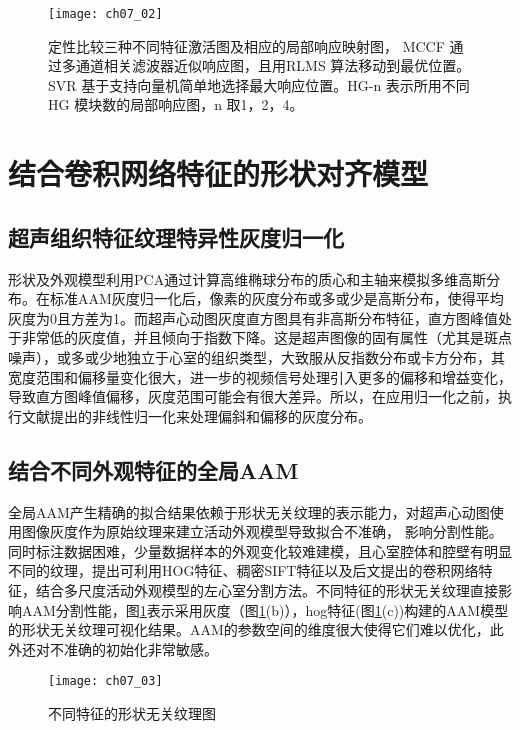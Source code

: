 \begin{figure}[!htbp]
\centering
\texttt{[image: ch07\_02]}
\caption{定性比较三种不同特征激活图及相应的局部响应映射图， MCCF 通过多通道相关滤波器近似响应图，且用RLMS 算法移动到最优位置。SVR 基于支持向量机简单地选择最大响应位置。HG-n 表示所用不同HG 模块数的局部响应图，n 取1，2，4。}
\label{fig:ch07_02}
\end{figure}
 
\section{结合卷积网络特征的形状对齐模型} 

\subsection{超声组织特征纹理特异性灰度归一化} 
形状及外观模型利用PCA通过计算高维椭球分布的质心和主轴来模拟多维高斯分布。在标准AAM灰度归一化后，像素的灰度分布或多或少是高斯分布，使得平均灰度为0且方差为1。而超声心动图灰度直方图具有非高斯分布特征，直方图峰值处于非常低的灰度值，并且倾向于指数下降。这是超声图像的固有属性（尤其是斑点噪声），或多或少地独立于心室的组织类型，大致服从反指数分布或卡方分布\citep{Bosch2002}，其宽度范围和偏移量变化很大，进一步的视频信号处理引入更多的偏移和增益变化，导致直方图峰值偏移，灰度范围可能会有很大差异。所以，在应用归一化之前，执行文献提出的非线性归一化来处理偏斜和偏移的灰度分布。

\subsection{结合不同外观特征的全局AAM}
全局AAM产生精确的拟合结果依赖于形状无关纹理的表示能力，对超声心动图使用图像灰度作为原始纹理来建立活动外观模型导致拟合不准确， 影响分割性能。同时标注数据困难，少量数据样本的外观变化较难建模，且心室腔体和腔壁有明显不同的纹理，提出可利用HOG特征、稠密SIFT特征以及后文提出的卷积网络特征，结合多尺度活动外观模型的左心室分割方法。不同特征的形状无关纹理直接影响AAM分割性能，图\ref{fig:ch07_02}表示采用灰度（图\ref{fig:ch07_02}(b)），hog特征(图\ref{fig:ch07_02}(c))构建的AAM模型的形状无关纹理可视化结果。AAM的参数空间的维度很大使得它们难以优化，此外还对不准确的初始化非常敏感。
\begin{figure}[!htbp]
\centering
\texttt{[image: ch07\_03]}
\caption{不同特征的形状无关纹理图}
\label{fig:ch07_03}
\end{figure} 
 
